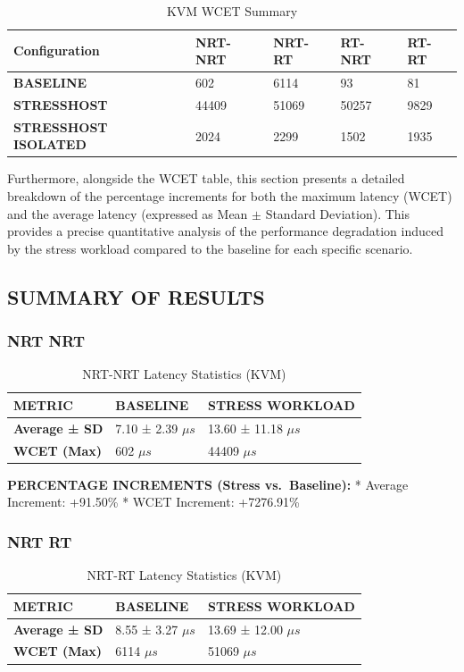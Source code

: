\begin{table}
\centering
\caption{KVM WCET Summary}
\label{tab:kvm:wcet-summary}
\begin{tabularx}{\linewidth}{@{}YYYYY@{}}
\toprule
Configuration & NRT-NRT & NRT-RT & RT-NRT & RT-RT\tabularnewline
\midrule
\textbf{BASELINE} & 602 & 6114 & 93 & 81\tabularnewline
\textbf{STRESSHOST} & 44409 & 51069 & 50257 & 9829\tabularnewline
\textbf{STRESSHOST ISOLATED} & 2024 & 2299 & 1502 & 1935\tabularnewline
\bottomrule
\end{tabularx}
\end{table}

Furthermore, alongside the WCET table, this section presents a detailed
breakdown of the percentage increments for both the maximum latency
(WCET) and the average latency (expressed as Mean \(\pm\) Standard
Deviation). This provides a precise quantitative analysis of the
performance degradation induced by the stress workload compared to the
baseline for each specific scenario.

\subsection{SUMMARY OF RESULTS}\label{summary-of-results}

\subsubsection{NRT NRT}\label{nrt-nrt}

\begin{table}
\centering
\caption{NRT-NRT Latency Statistics (KVM)}
\label{tab:kvm:nrt-nrt}
\begin{tabularx}{\linewidth}{@{}YYY@{}}
\toprule
METRIC & BASELINE & STRESS WORKLOAD\tabularnewline
\midrule
\textbf{Average ± SD} & 7.10 ± 2.39 $\mu s$ & 13.60 ± 11.18 $\mu s$\tabularnewline
\textbf{WCET (Max)} & 602 $\mu s$ & 44409 $\mu s$\tabularnewline
\bottomrule
\end{tabularx}
\end{table}

\textbf{PERCENTAGE INCREMENTS (Stress vs.~Baseline):} * Average
Increment: +91.50\% * WCET Increment: +7276.91\%

\subsubsection{NRT RT}\label{nrt-rt}

\begin{table}
\centering
\caption{NRT-RT Latency Statistics (KVM)}
\label{tab:kvm:nrt-rt}
\begin{tabularx}{\linewidth}{@{}YYY@{}}
\toprule
METRIC & BASELINE & STRESS WORKLOAD\tabularnewline
\midrule
\textbf{Average ± SD} & 8.55 ± 3.27 $\mu s$ & 13.69 ± 12.00 $\mu s$\tabularnewline
\textbf{WCET (Max)} & 6114 $\mu s$ & 51069 $\mu s$\tabularnewline
\bottomrule
\end{tabularx}
\end{table}

